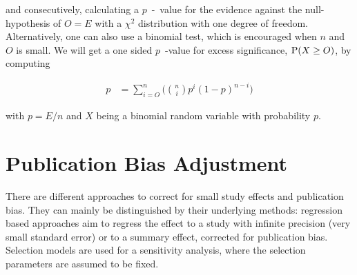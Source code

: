 \documentclass[11pt,a4paper,twoside]{book}\usepackage[]{graphicx}\usepackage[]{color}
\begin{document}
and consecutively, calculating a $p$\hspace{0.4mm}~-~value for the evidence against the null-hypothesis of $O = E$ with a $\chi^2$ distribution with one degree of freedom. Alternatively, one can also use a binomial test, which is encouraged when $n$ and $O$ is small. We will get a one sided $p$\hspace{0.4mm}~-value for excess significance, $\P(X \geq O)$, by computing

\begin{align}
p &= \sum_{i = O}^n\Big({n \choose i} p^i (1-p)^{n - i}\Big)
\end{align}

with $p = E/n$ and $X$ being a binomial random variable with probability $p$. 











\section{Publication Bias Adjustment}
There are different approaches to correct for small study effects and publication bias. They can mainly be distinguished by their underlying methods: regression based approaches aim to regress the effect to a study with infinite precision (\ie very small standard error) or to a summary effect, corrected for publication bias. Selection models are used for a sensitivity analysis, where the selection parameters are assumed to be fixed. 
\end{document}
